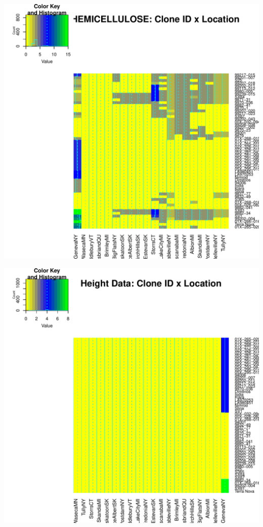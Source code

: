 \documentclass{article}\usepackage[]{graphicx}\usepackage[]{color}
\makeatletter
\def\maxwidth{ %
  \ifdim\Gin@nat@width>\linewidth
    \linewidth
  \else
    \Gin@nat@width
  \fi
}
\newenvironment{knitrout}{}{} %
\makeatother
\begin{document}
\begin{knitrout}
{}




{\centering \includegraphics[width=\maxwidth]{figure/HeatmapSurvivalYield-3} 

}




{\centering \includegraphics[width=\maxwidth]{figure/HeatmapSurvivalYield-4} 

}
\end{knitrout}
\end{document}
